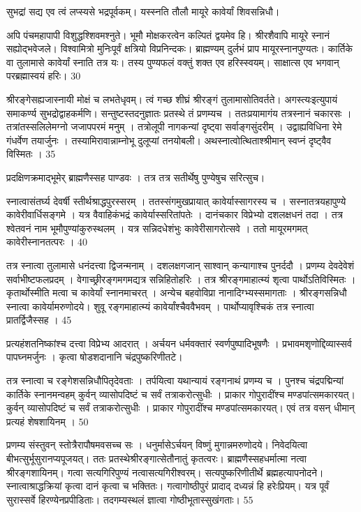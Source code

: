 सुभद्रां सद्य एव त्वं लप्स्यसे भद्रपूर्वकम्।
यस्स्नति तौलौ मायूरे कावेर्यां शिवसन्निधौ।

अपि पंचमहापापी विशुद्धश्शिवमश्नुते।
भूमौ मोक्षकरत्वेन कल्पितं द्वयमेव हि।
श्रीरशैवापि मायूरे स्नानं सह्योद्भवेजले।
विश्वामित्रो मुनिःपूर्वं क्षत्रियो विप्रनिन्दकः।
ब्राह्मण्यम् दुर्लभं प्राप मायूरस्नानपुण्यतः।
कार्तिके वा तुलामासे कावेर्यां स्नाति तत्र यः।
तस्य पुण्यफलं वक्तुं शक्त एव हरिस्स्वयम्।
साक्षात्स एव भगवान् परब्रह्मास्वयं हरिः।
30

श्रीरङ्गेसह्यजास्नायी मोक्षं च लभतेधृवम्।
त्वं गच्छ शीघ्रं श्रीरङ्गं तुलामासोतिवर्तते।
अगस्त्यःइत्युपायं समाकर्ण्य सुभद्रोद्वाहकर्मणि।
सन्तुष्टस्तदनुज्ञातः प्रतस्थे तं प्रणम्यच ।
ततःप्रयामागंय तत्रस्नानं चकारसः ।
तत्रांतस्सलिलेमग्नो जजापपरमं मनुम् ।
तत्रोलूपी नागकन्यां दृष्ट्वा सर्वाङ्गसुंदरीम् ।
उद्वाह्यविधिना रेमे गंधर्वेण तयार्जुनः ।
तस्यामिरावान्नाम्नोभू दुलूप्यां तनयोबली।
अथस्नात्वोत्थिताश्श्रीमान् स्वप्नं दृष्ट्वैव विस्मितः ।
35

प्रदक्षिणक्रमाद्भूमेर् ब्राह्मणैस्सह पाण्डवः ।
तत्र तत्र सतीर्थेषु पुण्येषुच सरित्सुच।

स्नात्वासंतर्घ्य देवर्षी स्तीर्थश्राद्धपुरस्सरम् ।
ततस्संगमुखप्रायात् कावेर्यास्सागरस्य च ।
सस्नातत्रयहापुण्ये कावेरीवार्धिसङ्गमे ।
यत्र वैवाहिकंभद्रं कावेर्यास्सरितांपतेः ।
दानंचकार विप्रेभ्यो दशलक्षधनं तदा ।
तत्र श्वेतवनं नाम भूमौपुण्यांकुरुस्थलम् ।
यत्र सन्निदधेशंभुः कावेरीसागरोत्सवे ।
ततो मायूरमगमत् कावेरीस्नानतत्परः ।
40

तत्र स्नात्वा तुलामासे धनंदत्त्वा द्विजन्मनाम् ।
दशलक्षगजान् साश्वान् कन्यागाश्च पुनर्ददौ ।
प्रणम्य देवदेवेशं सर्वाभीष्टफलप्रदम् ।
वेगाच्छ्रीरङ्गमगमद्यत्र सन्निहितोहरिः ।
तत्र श्रीरङ्गमाहात्म्यं शृत्वा पार्थोऽतिविस्मितः ।
कृतार्थोस्मीति मत्वा च कावेर्यां स्नानमाचरत् ।
अन्येच बहवोविप्रा नानादिग्भ्यस्समागताः ।
श्रीरङ्गसन्निधौ स्नात्वा कावेर्यामरुणोदये।
शुवू रङ्गमाहात्म्यं कावेर्यांश्चैववैभवम् ।
पार्थोप्यावृश्चिकं तत्र स्नात्वा प्रातर्द्विजैस्सह ।
45

प्रत्यहंशतनिष्कांश्च दत्त्वा विप्रेभ्य आदरात् ।
अर्चयन धर्मवक्तारं स्वर्णपुष्पादिभूषणैः ।
प्रभावमशृणोद्दिव्यास्सर्व पापघ्नमर्जुनः ।
कृत्वा षोडशदानानि चंद्रपुष्करिणीतटे।

तत्र स्नात्वा च रङ्गेशसन्निधौपितृदेवताः ।
तर्पयित्वा यथान्यायं रङ्गनाथं प्रणम्य च ।
पुनश्च चंद्रपद्मिन्यां कार्तिके स्नानमन्वहम् कुर्वन् व्यासोपदिष्टं च सर्वं तत्राकरोत्सुधीः ।
प्राकार गोपुरादींश्च मण्डपांत्समकारयत्।
कुर्वन् व्यासोपदिष्टं च सर्वं तत्राकरोत्सुधीः ।
प्राकार गोपुरादींश्च मण्डपांत्समकारयत्।
एवं तत्र वसन् धीमान् प्रत्यहं शेषशायिनम् ।
50

प्रणम्य संस्तुवन् स्तोत्रैरापौषमवसच्च सः ।
धनुर्मासेऽर्चयन् विष्णुं मुगान्नमरुणोदये।
निवेदयित्वा बीभत्सुर्भूसुरानप्यपूजयत्।
ततः प्रतस्थेश्रीरङ्गात्सेतौनातुं कृतत्वरः।
ब्राह्मणैस्सहधर्मात्मा नत्वा श्रीरङ्गशायिनम्।
गत्वा सत्यगिरिपुण्यं नत्वासत्यगिरीश्वरम्।
सत्यपुष्करिणीतीर्थे ब्रह्महत्यापनोदने।
स्नात्वाश्राद्धक्रियां कृत्वा दानं कृत्वा च भक्तितः।
गत्वागोष्ठीपुरं प्रादाद् दध्यन्नं हि हरेःप्रियम्।
यत्र पूर्वं सुरास्सर्वे हिरण्येनप्रपीडिताः।
तदगम्यस्थलं ज्ञात्वा गोष्ठीभूतास्सुखंगताः।
55

